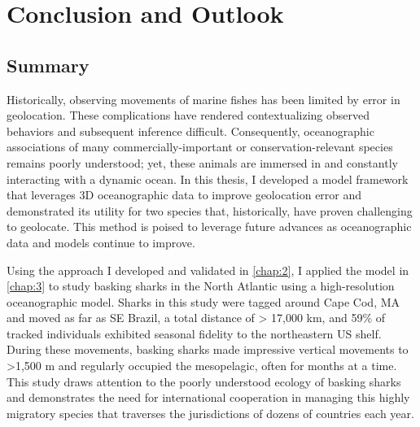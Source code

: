 \chapter{Conclusion and Outlook}
\label{chap:6}
\clearpage
\raggedbottom






\section{Summary}

Historically, observing movements of marine fishes has been limited by error in geolocation. These complications have rendered contextualizing observed behaviors and subsequent inference difficult. Consequently, oceanographic associations of many commercially-important or conservation-relevant species remains poorly understood; yet, these animals are immersed in and constantly interacting with a dynamic ocean. In this thesis, I developed a model framework that leverages 3D oceanographic data to improve geolocation error and demonstrated its utility for two species that, historically, have proven challenging to geolocate. This method is poised to leverage future advances as oceanographic data and models continue to improve.

Using the approach I developed and validated in \cref{chap:2}, I applied the model in \cref{chap:3} to study basking sharks in the North Atlantic using a high-resolution oceanographic model. Sharks in this study were tagged around Cape Cod, MA and moved as far as SE Brazil, a total distance of > 17,000 km, and 59\% of tracked individuals exhibited seasonal fidelity to the northeastern US shelf. During these movements, basking sharks made impressive vertical movements to >1,500 m and regularly occupied the mesopelagic, often for months at a time. This study draws attention to the poorly understood ecology of basking sharks and demonstrates the need for international cooperation in managing this highly migratory species that traverses the jurisdictions of dozens of countries each year.

